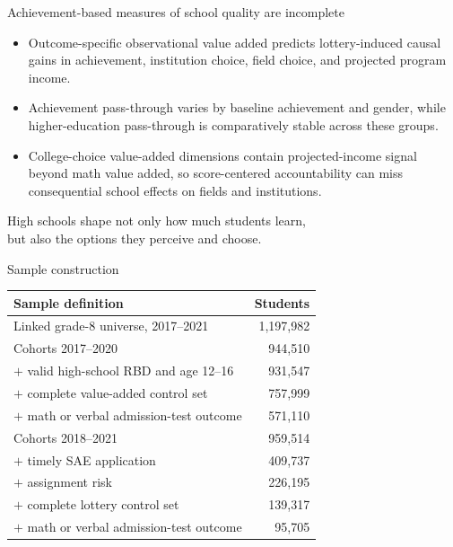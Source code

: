 \documentclass[11pt,aspectratio=169]{beamer}
\begin{document}
\begin{frame}{Achievement-based measures of school quality are incomplete}
\begin{itemize}
  \addtolength{\itemsep}{0.85em}
  \item Outcome-specific observational value added predicts lottery-induced causal gains in achievement, institution choice, field choice, and projected program income.

  \item Achievement pass-through varies by baseline achievement and gender, while higher-education pass-through is comparatively stable across these groups.

  \item College-choice value-added dimensions contain projected-income signal beyond math value added, so score-centered accountability can miss consequential school effects on fields and institutions.
\end{itemize}
\end{frame}

\begin{frame}[standout]
High schools shape not only how much students learn,\\[0.5em]
but also the options they perceive and choose.
\end{frame}

\appendix

\begin{frame}{Sample construction}
\centering
\small
\begin{tabular}{lr}
\toprule
Sample definition & Students \\
\midrule
Linked grade-8 universe, 2017--2021 & 1,197,982 \\
\midrule
Cohorts 2017--2020 & 944,510 \\
$+$ valid high-school RBD and age 12--16 & 931,547 \\
$+$ complete value-added control set & 757,999 \\
$+$ math or verbal admission-test outcome & 571,110 \\
\midrule
Cohorts 2018--2021 & 959,514 \\
$+$ timely SAE application & 409,737 \\
$+$ assignment risk & 226,195 \\
$+$ complete lottery control set & 139,317 \\
$+$ math or verbal admission-test outcome & 95,705 \\
\bottomrule
\end{tabular}
\end{frame}
\end{document}
